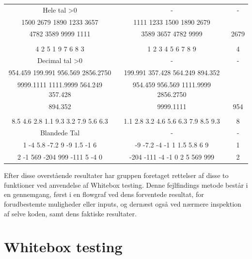 \documentclass[11pt]{article}
\begin{document}
\begin{center}
\begin{tabular}{ |c|c|c| }
             Hele tal \textgreater 0 & - & - \\
              1500 2679 1890 1233 3657 & 1111 1233 1500 1890 2679 & \\ 
              4782 3589 9999 1111 & 3589 3657 4782 9999 & 2679\\
              &&\\
              4 2 5 1 9 7 6 8 3 & 1 2 3 4 5 6 7 8 9 & 4 \\
             Decimal tal \textgreater 0 & - & - \\
              954.459 199.991 956.569 2856.2750 & 199.991 357.428 564.249 894.352 & \\ 
              9999.1111 1111.9999 564.249 357.428 & 954.459 956.569 1111.9999 2856.2750 & \\ 
              894.352 & 9999.1111 & 954\\ 
              &&\\
              8.5 4.6 2.8 1.1 9.3 3.2 7.9 5.6 6.3 & 1.1 2.8 3.2 4.6 5.6 6.3 7.9 8.5 9.3 & 8\\ 
             Blandede Tal & - & -\\
              1 -4 5.8 -7.2 9 -9 1.5 -1 6 & -9 -7.2 -4 -1 1 1.5 5.8 6 9 & 1 \\
              2 -1  569 -204 999 -111 5 -4 0 & -204 -111 -4 -1 0 2 5 569 999 & 2\\
             \hline
        \end{tabular}
    \end{center}
    
    \newpage \noindent
    Efter disse overstående resultater har gruppen foretaget rettelser af disse to funktioner ved anvendelse af Whitebox testing. Denne fejlfindings metode består i en gennemgang, først i en flowgraf ved dens forventede resultat, for forudbestemte muligheder eller inputs, og dernæst også ved nærmere inspektion af selve koden, samt dens faktiske resultater.
    
    \section{Whitebox testing}
\end{document}
